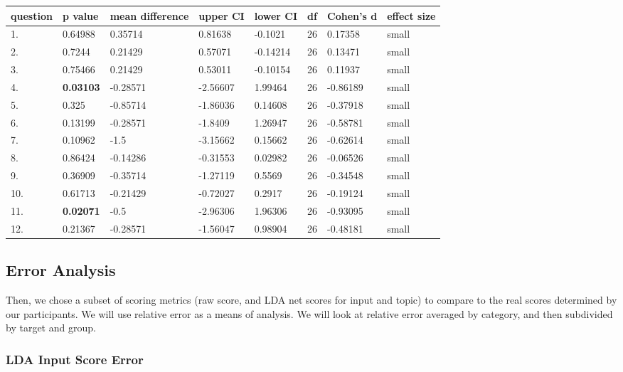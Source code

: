 \documentclass[11pt, twoside, reqno]{book}
\begin{document}
\begin{table}[h!]
    \raggedright
    \begin{tabular}{|l|l|l|l|l|l|l|l|}
    \hline
        question & p value & mean difference & upper CI & lower CI & df & Cohen's d & effect size  \\ \hline
        1. & 0.64988 & 0.35714 & 0.81638 & -0.1021 & 26 & 0.17358 & small \\ \hline
        2. & 0.7244 & 0.21429 & 0.57071 & -0.14214 & 26 & 0.13471 & small  \\ \hline
        3. & 0.75466 & 0.21429 & 0.53011 & -0.10154 & 26 & 0.11937 & small  \\ \hline
        4. & \textbf{0.03103} & -0.28571 & -2.56607 & 1.99464 & 26 & -0.86189 & small \\ \hline
        5. & 0.325 & -0.85714 & -1.86036 & 0.14608 & 26 & -0.37918 & small  \\ \hline
        6. & 0.13199 & -0.28571 & -1.8409 & 1.26947 & 26 & -0.58781 & small \\ \hline
        7. & 0.10962 & -1.5 & -3.15662 & 0.15662 & 26 & -0.62614 & small \\ \hline
        8. & 0.86424 & -0.14286 & -0.31553 & 0.02982 & 26 & -0.06526 & small \\ \hline
        9. & 0.36909 & -0.35714 & -1.27119 & 0.5569 & 26 & -0.34548 & small \\ \hline
        10. & 0.61713 & -0.21429 & -0.72027 & 0.2917 & 26 & -0.19124 & small  \\ \hline
        11. & \textbf{0.02071} & -0.5 & -2.96306 & 1.96306 & 26 & -0.93095 & small \\ \hline
        12. & 0.21367 & -0.28571 & -1.56047 & 0.98904 & 26 & -0.48181 & small \\ \hline
    \end{tabular}
\end{table}

\subsection{Error Analysis}

Then, we chose a subset of scoring metrics (raw score, and LDA net scores for input and topic) to compare to the real scores determined by our participants. We will use relative error as a means of analysis. We will look at relative error averaged by category, and then subdivided by target and group.

\subsubsection{\textbf{LDA Input Score Error}}
\end{document}
